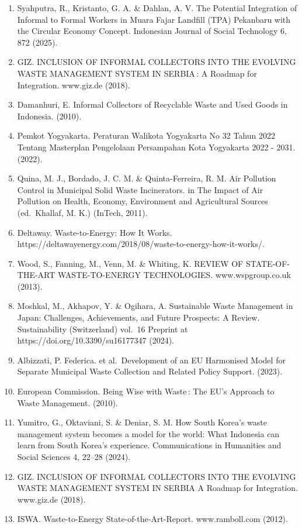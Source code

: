 \documentclass[
  letterpaper,
  DIV=11,
  numbers=noendperiod]{scrreprt}
\begin{document}
\begin{enumerate}
  Organic Pollutants. (2024).
\item
  Syahputra, R., Kristanto, G. A. \& Dahlan, A. V. The Potential
  Integration of Informal to Formal Workers in Muara Fajar Landfill
  (TPA) Pekanbaru with the Circular Economy Concept. Indonesian Journal
  of Social Technology 6, 872 (2025).
\item
  GIZ. INCLUSION OF INFORMAL COLLECTORS INTO THE EVOLVING WASTE
  MANAGEMENT SYSTEM IN SERBIA\,: A Roadmap for Integration. www.giz.de
  (2018).
\item
  Damanhuri, E. Informal Collectors of Recyclable Waste and Used Goods
  in Indonesia. (2010).
\item
  Pemkot Yogyakarta. Peraturan Walikota Yogyakarta No 32 Tahun 2022
  Tentang Masterplan Pengelolaan Persampahan Kota Yogyakarta 2022 -
  2031. (2022).
\item
  Quina, M. J., Bordado, J. C. M. \& Quinta-Ferreira, R. M. Air
  Pollution Control in Municipal Solid Waste Incinerators. in The Impact
  of Air Pollution on Health, Economy, Environment and Agricultural
  Sources (ed.~Khallaf, M. K.) (InTech, 2011).
\item
  Deltaway. Waste-to-Energy: How It Works.
  https://deltawayenergy.com/2018/08/waste-to-energy-how-it-works/.
\item
  Wood, S., Fanning, M., Venn, M. \& Whiting, K. REVIEW OF
  STATE-OF-THE-ART WASTE-TO-ENERGY TECHNOLOGIES. www.wspgroup.co.uk
  (2013).
\item
  Moshkal, M., Akhapov, Y. \& Ogihara, A. Sustainable Waste Management
  in Japan: Challenges, Achievements, and Future Prospects: A Review.
  Sustainability (Switzerland) vol.~16 Preprint at
  https://doi.org/10.3390/su16177347 (2024).
\item
  Albizzati, P. Federica. et al.~Development of an EU Harmonised Model
  for Separate Municipal Waste Collection and Related Policy Support.
  (2023).
\item
  European Commission. Being Wise with Waste\,: The EU's Approach to
  Waste Management. (2010).
\item
  Yumitro, G., Oktaviani, S. \& Deniar, S. M. How South Korea's waste
  management system becomes a model for the world: What Indonesia can
  learn from South Korea's experience. Communications in Humanities and
  Social Sciences 4, 22--28 (2024).
\item
  GIZ. INCLUSION OF INFORMAL COLLECTORS INTO THE EVOLVING WASTE
  MANAGEMENT SYSTEM IN SERBIA A Roadmap for Integration. www.giz.de
  (2018).
\item
  ISWA. Waste-to-Energy State-of-the-Art-Report. www.ramboll.com (2012).
\end{enumerate}
\end{document}
